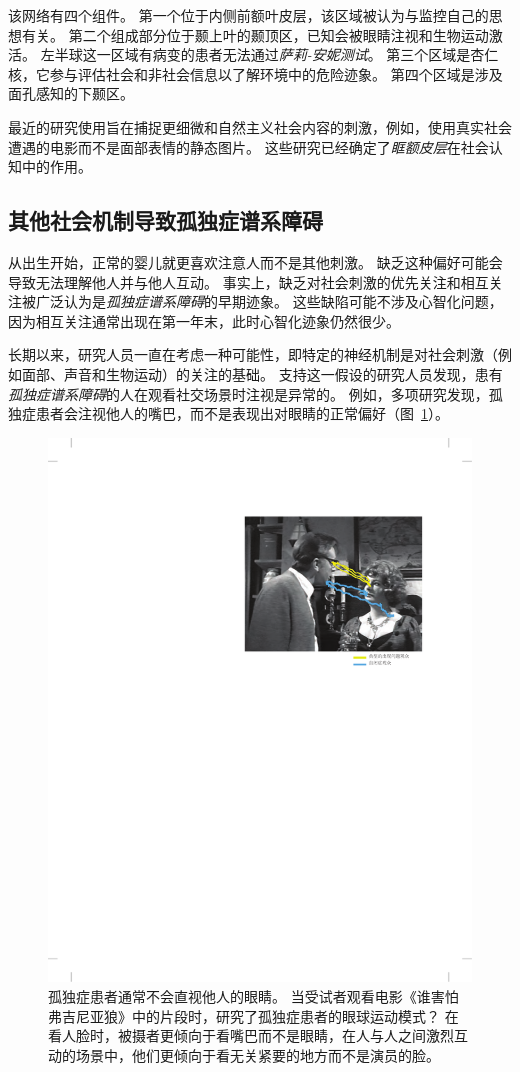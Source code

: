 该网络有四个组件。
第一个位于内侧前额叶皮层，该区域被认为与监控自己的思想有关。
第二个组成部分位于颞上叶的颞顶区，已知会被眼睛注视和生物运动激活。
左半球这一区域有病变的患者无法通过\textit{萨莉-安妮测试}。
第三个区域是杏仁核，它参与评估社会和非社会信息以了解环境中的危险迹象。
第四个区域是涉及面孔感知的下颞区。


最近的研究使用旨在捕捉更细微和自然主义社会内容的刺激，例如，使用真实社会遭遇的电影而不是面部表情的静态图片。
这些研究已经确定了\textit{眶额皮层}在社会认知中的作用。



\subsection{其他社会机制导致孤独症谱系障碍}

从出生开始，正常的婴儿就更喜欢注意人而不是其他刺激。
缺乏这种偏好可能会导致无法理解他人并与他人互动。
事实上，缺乏对社会刺激的优先关注和相互关注被广泛认为是\textit{孤独症谱系障碍}的早期迹象。
这些缺陷可能不涉及心智化问题，因为相互关注通常出现在第一年末，此时心智化迹象仍然很少。


长期以来，研究人员一直在考虑一种可能性，即特定的神经机制是对社会刺激（例如面部、声音和生物运动）的关注的基础。
支持这一假设的研究人员发现，患有\textit{孤独症谱系障碍}的人在观看社交场景时注视是异常的。
例如，多项研究发现，孤独症患者会注视他人的嘴巴，而不是表现出对眼睛的正常偏好（图~\ref{fig:62_5}）。


\begin{figure}[htbp]
	\centering
	\includegraphics[width=0.78\linewidth]{chap62/fig_62_5}
	\caption{孤独症患者通常不会直视他人的眼睛。
		当受试者观看电影《谁害怕弗吉尼亚狼》中的片段时，研究了孤独症患者的眼球运动模式？
		在看人脸时，被摄者更倾向于看嘴巴而不是眼睛，在人与人之间激烈互动的场景中，他们更倾向于看无关紧要的地方而不是演员的脸\cite{klin2002defining}。}
	\label{fig:62_5}
\end{figure}



